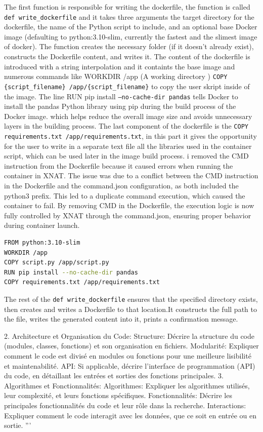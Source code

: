 The first function is responsible for writing the dockerfile, the function is called \texttt{def write\_dockerfile} and it takes three arguments the target directory for the dockerfile, the name of the Python script to include, and an optional base Docker image (defaulting to python:3.10-slim, currently the fastest and the slimest image of docker). The function creates the necessary folder (if it doesn't already exist), constructs the Dockerfile content, and writes it. The content of the dockerfile is introduced with a string interpolation and it containts the base image and numerous commands like WORKDIR /app (A working directory ) \texttt{COPY \{script\_filename\} /app/\{script\_filename\}} to copy the user skript inside of the image. The line  RUN pip install \texttt{--no-cache-dir pandas} tells Docker to install the pandas Python library using pip during the build process of the Docker image.  which helps reduce the overall image size and avoids unnecessary layers in the building process. The last component of the dockerfile is the \texttt{COPY requirements.txt /app/requirements.txt}, in this part it gives the opportunity for the user to write in a separate text file all the libraries used in the container script, which can be used later in the image build process.
i removed the CMD instruction from the Dockerfile because it caused errors when running the container in XNAT. The issue was due to a conflict between the CMD instruction in the Dockerfile and the command.json configuration, as both included the python3 prefix. This led to a duplicate command execution, which caused the container to fail. By removing CMD in the Dockerfile, the execution logic is now fully controlled by XNAT through the command.json, ensuring proper behavior during container launch.

\begin{lstlisting}[language=bash]
FROM python:3.10-slim
WORKDIR /app
COPY script.py /app/script.py
RUN pip install --no-cache-dir pandas
COPY requirements.txt /app/requirements.txt
\end{lstlisting}
The rest of the \texttt{def write\_dockerfile} ensures that the specified directory exists, then creates and writes a Dockerfile to that location.It constructs the full path to the file, writes the generated content into it, prints a confirmation message.


 








 
2. Architecture et Organisation du Code:
Structure:
Décrire la structure du code (modules, classes, fonctions) et son organisation en fichiers.
Modularité:
Expliquer comment le code est divisé en modules ou fonctions pour une meilleure lisibilité et maintenabilité.
API:
Si applicable, décrire l'interface de programmation (API) du code, en détaillant les entrées et sorties des fonctions principales. 
3. Algorithmes et Fonctionnalités:
Algorithmes:
Expliquer les algorithmes utilisés, leur complexité, et leurs fonctions spécifiques.
Fonctionnalités:
Décrire les principales fonctionnalités du code et leur rôle dans la recherche.
Interactions:
Expliquer comment le code interagit avec les données, que ce soit en entrée ou en sortie. 
'''